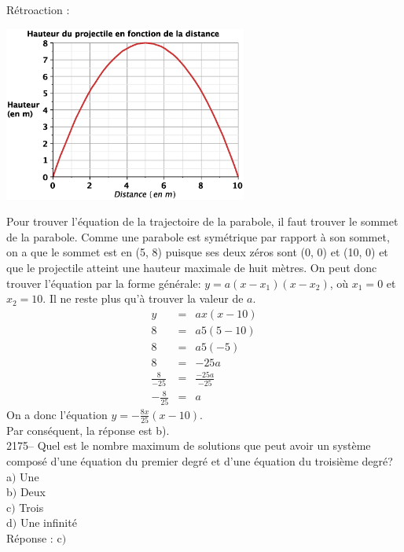 \documentclass[letterpaper, 12pt]{article}
\begin{document}
R\'etroaction :\\
\begin{center}
 \includegraphics[width=8cm,bb=20 197 575 594]{Q2174.eps}
\end{center}
Pour trouver l'\'equation de la trajectoire de la parabole, il faut trouver le sommet de la parabole. Comme une parabole est sym\'etrique par rapport \`a son sommet, on a que le sommet est en (5, 8) puisque ses deux z\'eros sont (0, 0) et (10, 0) et que le projectile atteint une hauteur maximale de huit m\`etres. On peut donc trouver l'\'equation par la forme g\'en\'erale: $y=a(x-x_{1})(x-x_{2})$, o\`u $x_{1}=0$ et $x_{2}=10$.  Il ne reste plus qu'\`a trouver la valeur de $a$.
\begin{eqnarray*}
 y&=&ax(x-10)\\
 8&=&a5(5-10)\\
 8&=&a5(-5)\\
 8&=&-25a\\[2mm]
 \frac{8}{-25}&=&\frac{-25a}{-25}\\[2mm]
 -\frac{8}{25}&=&a
\end{eqnarray*}
On a donc l'\'equation $y=-\frac{8x}{25}(x-10)$.\\
Par cons\'equent, la r\'eponse est b).\\

2175-- Quel est le nombre maximum de solutions que peut avoir un syst\`eme compos\'e d'une \'equation du premier degr\'e et d'une \'equation du troisi\`eme degr\'e?\\

a$)$ Une\\
b$)$ Deux\\
c$)$ Trois\\
d$)$ Une infinit\'e\\

R\'eponse : c$)$\\
\end{document}
